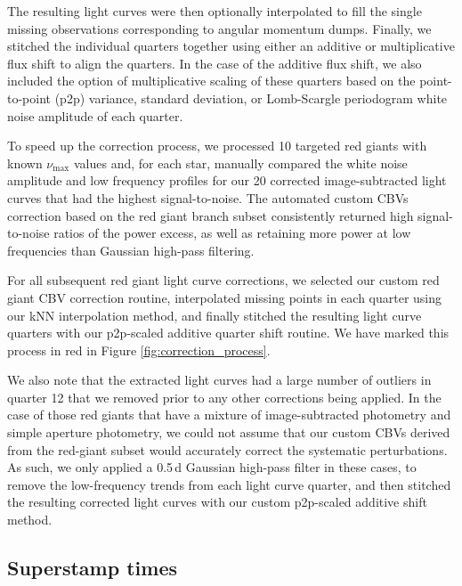 The resulting light curves were then optionally interpolated to fill the single missing observations corresponding to angular momentum dumps. Finally, we stitched the individual quarters together using either an additive or multiplicative flux shift to align the quarters. In the case of the additive flux shift, we also included the option of multiplicative scaling of these quarters based on the point-to-point (p2p) variance, standard deviation, or Lomb-Scargle periodogram white noise amplitude of each quarter.

To speed up the correction process, we processed 10 \Kepler{} targeted red giants with known $\nu_\mathrm{max}$ values and, for each star, manually compared the white noise amplitude and low frequency profiles for our 20 corrected image-subtracted light curves that had the highest signal-to-noise. The automated custom CBVs correction based on the red giant branch subset consistently returned high signal-to-noise ratios of the power excess, as well as retaining more power at low frequencies than Gaussian high-pass filtering. 

For all subsequent red giant light curve corrections, we selected our custom red giant CBV correction routine, interpolated missing points in each quarter using our kNN interpolation method, and finally stitched the resulting light curve quarters with our p2p-scaled additive quarter shift routine. We have marked this process in red in Figure \ref{fig:correction_process}.

We also note that the extracted light curves had a large number of outliers in quarter 12 that we removed prior to any other corrections being applied. In the case of those red giants that have a mixture of image-subtracted photometry and simple aperture photometry, we could not assume that our custom CBVs derived from the red-giant subset would accurately correct the systematic perturbations. As such, we only applied a 0.5\,d Gaussian high-pass filter in these cases, to remove the low-frequency trends from each light curve quarter, and then stitched the resulting corrected light curves with our custom p2p-scaled additive shift method.

\subsection{Superstamp times}


